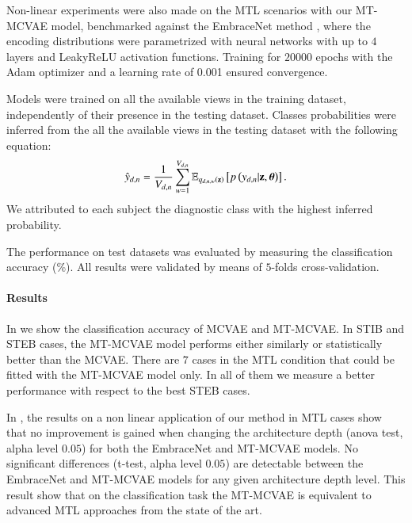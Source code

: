 	Non-linear experiments were also made on the MTL scenarios with our MT-MCVAE model, benchmarked against the EmbraceNet method \citep{embracenet}, where the encoding distributions were parametrized with neural networks with up to $4$ layers and LeakyReLU activation functions.
	Training for $20000$ epochs with the Adam optimizer and a learning rate of 0.001 ensured convergence.

Models were trained on all the available views in the training dataset, independently of their presence in the testing dataset.
Classes probabilities were inferred from the all the available views in the testing dataset with the following equation:
\begin{equation}\label{eq:reconstructiony}
\begin{aligned}
\hat{y}_{d,n} = \frac{1}{V_{d, n}} \sum_{w=1}^{V_{d, n}} \operatorname{\mathbb{E}}_{q_{d,n,w}(\mathbf{z})}\left[p\left(y_{d,n}|\mathbf{z},\boldsymbol{\theta}\right)\right].
\end{aligned}
\end{equation}
We attributed to each subject the diagnostic class with the highest inferred probability.

The performance on test datasets was evaluated by measuring the classification accuracy (\%).
All results were validated by means of $5$-folds cross-validation.

\paragraph{Results}
In  we show the classification accuracy of MCVAE and MT-MCVAE.
In STIB and STEB cases, the MT-MCVAE model performs either similarly or statistically better than the MCVAE.
There are $7$ cases in the MTL condition  that could be fitted with the MT-MCVAE model only.
In all of them we measure a better performance with respect to the best STEB cases.

	In , the results on a non linear application of our method in MTL cases show
	that no improvement is gained when changing the architecture depth (anova test, alpha level $0.05$) for both the EmbraceNet and MT-MCVAE models.
	No significant differences (t-test, alpha level $0.05$) are detectable between the EmbraceNet and MT-MCVAE models for any given architecture depth level.
	This result show that on the classification task the MT-MCVAE is equivalent to advanced MTL approaches from the state of the art.
